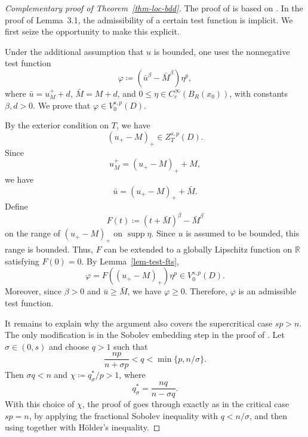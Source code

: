 \documentclass[11pt]{amsart}
\theoremstyle{plain}
\theoremstyle{definition}
\numberwithin{equation}{section}
\DeclareMathOperator*{\supp}{supp}
\begin{document}
\begin{proof}[Complementary proof of Theorem~\ref{thm-loc-bdd}]
The proof of \cite[Theorem~3.5]{KLL23} is based on \cite[Lemmas~3.1 and 3.4]{KLL23}. In the proof of Lemma~3.1, the admissibility of a certain test function is implicit. We first seize the opportunity to make this explicit.

Under the additional assumption that $u$ is bounded, one uses the nonnegative test function
\begin{equation*}
\varphi \coloneqq (\bar{u}^\beta - \bar{M}^\beta) \eta^p,
\end{equation*}
where $\bar{u}=u_M^+ + d$, $\bar{M}=M+d$, and $0\leq \eta \in C^\infty_c(B_R(x_0))$, with constants $\beta, d>0$. We prove that $\varphi \in V^{s, p}_0(D)$.

By the exterior condition on $T$, we have
\begin{equation*}
(u_+-M)_+ \in Z^{s, p}_T(D).
\end{equation*}
Since
\begin{equation*}
u_M^+ = (u_+-M)_+ + M,
\end{equation*}
we have
\begin{equation*}
\bar{u} = (u_+-M)_+ + \bar{M}.
\end{equation*}
Define
\begin{equation*}
F(t) \coloneqq (t+\bar{M})^\beta - \bar{M}^\beta
\end{equation*}
on the range of $(u_+-M)_+$ on $\supp{\eta}$. Since $u$ is assumed to be bounded, this range is bounded. Thus, $F$ can be extended to a globally Lipschitz function on $\mathbb{R}$ satisfying $F(0)=0$. By Lemma~\ref{lem-test-fts},
\begin{equation*}
\varphi = F((u_+-M)_+) \eta^p \in V^{s, p}_0(D).
\end{equation*}
Moreover, since $\beta>0$ and $\bar{u} \geq \bar{M}$, we have $\varphi \geq 0$. Therefore, $\varphi$ is an admissible test function.

It remains to explain why the argument also covers the supercritical case $sp>n$. The only modification is in the Sobolev embedding step in the proof of \cite[Lemma~3.4]{KLL23}. Let $\sigma \in (0,s)$ and choose $q>1$ such that
\begin{equation*}
\frac{np}{n+\sigma p} < q < \min\{p, n/\sigma\}.
\end{equation*}
Then $\sigma q<n$ and $\chi \coloneqq q^\ast_\sigma/p>1$, where
\begin{equation*}
q^\ast_\sigma = \frac{nq}{n-\sigma q}.
\end{equation*}
With this choice of $\chi$, the proof of \cite[Lemma~3.4]{KLL23} goes through exactly as in the critical case $sp=n$, by applying the fractional Sobolev inequality with $q<n/\sigma$, and then using \cite[Lemma~4.6]{Coz17} together with H\"older's inequality.
\end{proof}
\end{document}
